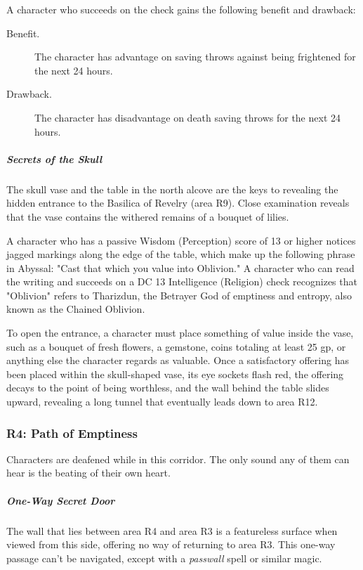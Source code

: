 \documentclass[10pt,a4paper,twoside,fancy,bg=print,twocolumn,openany,nodeprecatedcode]{dndbook}
\begin{document}
A character who succeeds on the check gains the following benefit and drawback:

\begin{DndSidebar}[float=!b]{}

\begin{description}
\item[Benefit.]
The character has advantage on saving throws against being frightened for the next 24 hours.
\item[Drawback.]
The character has disadvantage on death saving throws for the next 24 hours.
\end{description}



\end{DndSidebar}

\subparagraph{Secrets of the Skull}
The skull vase and the table in the north alcove are the keys to revealing the hidden entrance to the Basilica of Revelry (area R9). Close examination reveals that the vase contains the withered remains of a bouquet of lilies.

A character who has a passive Wisdom (Perception) score of 13 or higher notices jagged markings along the edge of the table, which make up the following phrase in Abyssal: "Cast that which you value into Oblivion." A character who can read the writing and succeeds on a DC 13 Intelligence (Religion) check recognizes that "Oblivion" refers to Tharizdun, the Betrayer God of emptiness and entropy, also known as the Chained Oblivion.

To open the entrance, a character must place something of value inside the vase, such as a bouquet of fresh flowers, a gemstone, coins totaling at least 25 gp, or anything else the character regards as valuable. Once a satisfactory offering has been placed within the skull-shaped vase, its eye sockets flash red, the offering decays to the point of being worthless, and the wall behind the table slides upward, revealing a long tunnel that eventually leads down to area R12.

\subsubsection{R4: Path of Emptiness}
Characters are deafened while in this corridor. The only sound any of them can hear is the beating of their own heart.

\subparagraph{One-Way Secret Door}
The wall that lies between area R4 and area R3 is a featureless surface when viewed from this side, offering no way of returning to area R3. This one-way passage can't be navigated, except with a \textit{passwall} spell or similar magic.
\end{document}
